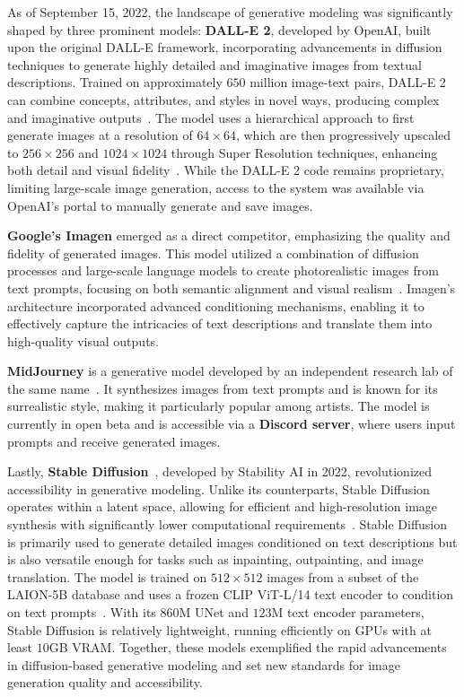 \documentclass[12pt,DIV14,BCOR12mm,a4paper,footinclude=false,headinclude,parskip=half-,twoside,openright,cleardoublepage=empty,toc=index,bibliography=totoc,listof=totoc]{scrreprt}
\numberwithin{equation}{chapter}
\begin{document}
As of September 15, 2022, the landscape of generative modeling was significantly shaped by three prominent models: \textbf{DALL-E 2}, developed by OpenAI, built upon the original DALL-E framework, incorporating advancements in diffusion techniques to generate highly detailed and imaginative images from textual descriptions. Trained on approximately $650$ million image-text pairs, DALL-E 2 can combine concepts, attributes, and styles in novel ways, producing complex and imaginative outputs~\cite{openai2022_dalle2}. The model uses a hierarchical approach to first generate images at a resolution of $64 \times 64$, which are then progressively upscaled to $256 \times 256$ and $1024 \times 1024$ through Super Resolution techniques, enhancing both detail and visual fidelity~\cite{ramesh2022hierarchical}. While the DALL-E 2 code remains proprietary, limiting large-scale image generation, access to the system was available via OpenAI’s portal to manually generate and save images.

\textbf{Google's Imagen} emerged as a direct competitor, emphasizing the quality and fidelity of generated images. This model utilized a combination of diffusion processes and large-scale language models to create photorealistic images from text prompts, focusing on both semantic alignment and visual realism~\cite{IMAGEN}. Imagen's architecture incorporated advanced conditioning mechanisms, enabling it to effectively capture the intricacies of text descriptions and translate them into high-quality visual outputs.

\textbf{MidJourney} is a generative model developed by an independent research lab of the same name~\cite{midjourney2022}. It synthesizes images from text prompts and is known for its surrealistic style, making it particularly popular among artists. The model is currently in open beta and is accessible via a \textbf{Discord server}, where users input prompts and receive generated images.

Lastly, \textbf{Stable Diffusion}~\cite{rando2022red}, developed by Stability AI in 2022, revolutionized accessibility in generative modeling. Unlike its counterparts, Stable Diffusion operates within a latent space, allowing for efficient and high-resolution image synthesis with significantly lower computational requirements~\cite{Latent_Diffusion}. Stable Diffusion is primarily used to generate detailed images conditioned on text descriptions but is also versatile enough for tasks such as inpainting, outpainting, and image translation. The model is trained on $512 \times 512$ images from a subset of the LAION-5B database and uses a frozen CLIP ViT-L/14 text encoder to condition on text prompts~\cite{stable_diffusion}. With its $860$M UNet and $123$M text encoder parameters, Stable Diffusion is relatively lightweight, running efficiently on GPUs with at least $10$GB VRAM. Together, these models exemplified the rapid advancements in diffusion-based generative modeling and set new standards for image generation quality and accessibility.
\end{document}
